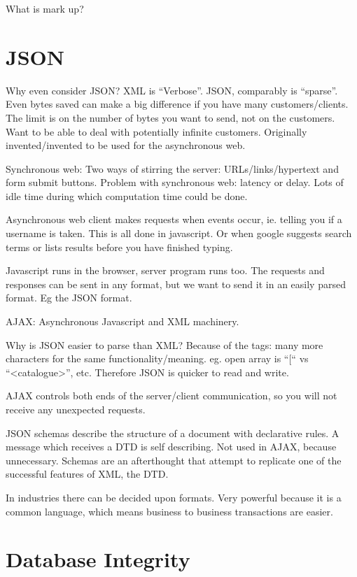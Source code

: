 \documentclass[11pt]{article}
\begin{document}
What is mark up?


\section{JSON}

Why even consider JSON? XML is “Verbose”. JSON, comparably is “sparse”. Even bytes saved can make a big difference if you have many customers/clients. The limit is on the number of bytes you want to send, not on the customers. Want to be able to deal with potentially infinite customers. Originally invented/invented to be used for the asynchronous web.

Synchronous web:
Two ways of stirring the server: URLs/links/hypertext and form submit buttons.
Problem with synchronous web: latency or delay. Lots of idle time during which computation time could be done.

Asynchronous web
client makes requests when events occur, ie. telling you if a username is taken. This is all done in javascript. Or when google suggests search terms or lists results before you have finished typing.

Javascript runs in the browser, server program runs too. The requests and responses can be sent in any format, but we want to send it in an easily parsed format. Eg the JSON format.

AJAX: Asynchronous Javascript and XML machinery.

Why is JSON easier to parse than XML? Because of the tags: many more characters for the same functionality/meaning. eg. open array is “[“ vs “<catalogue>”, etc. Therefore JSON is quicker to read and write.

AJAX controls both ends of the server/client communication, so you will not receive any unexpected requests.

JSON schemas describe the structure of a document with declarative rules. A message which receives a DTD is self describing. Not used in AJAX, because unnecessary. Schemas are an afterthought that attempt to replicate one of the successful features of XML, the DTD.

In industries there can be decided upon formats. Very powerful because it is a common language, which means business to business transactions are easier.




\section{Database Integrity}
\end{document}

